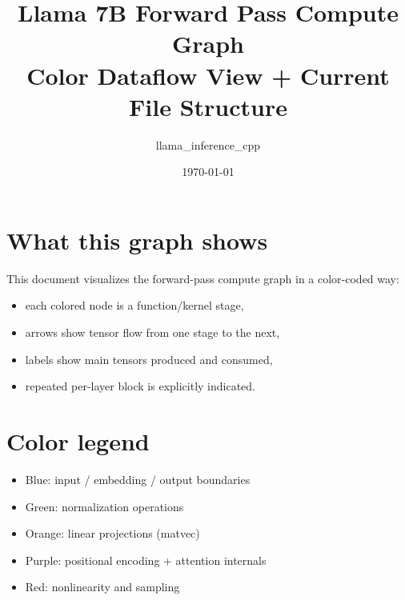 \documentclass[11pt]{article}
\title{Llama 7B Forward Pass Compute Graph\\\large Color Dataflow View + Current File Structure}
\author{llama\_inference\_cpp}
\date{\today}
\begin{document}
\maketitle
\tableofcontents
\newpage

\section{What this graph shows}
This document visualizes the forward-pass compute graph in a color-coded way:
\begin{itemize}[leftmargin=*]
  \item each colored node is a function/kernel stage,
  \item arrows show tensor flow from one stage to the next,
  \item labels show main tensors produced and consumed,
  \item repeated per-layer block is explicitly indicated.
\end{itemize}

\section{Color legend}
\begin{itemize}[leftmargin=*]
  \item \textcolor{blue!70!black}{Blue}: input / embedding / output boundaries
  \item \textcolor{green!50!black}{Green}: normalization operations
  \item \textcolor{orange!80!black}{Orange}: linear projections (matvec)
  \item \textcolor{purple!70!black}{Purple}: positional encoding + attention internals
  \item \textcolor{red!70!black}{Red}: nonlinearity and sampling
\end{itemize}
\end{document}
